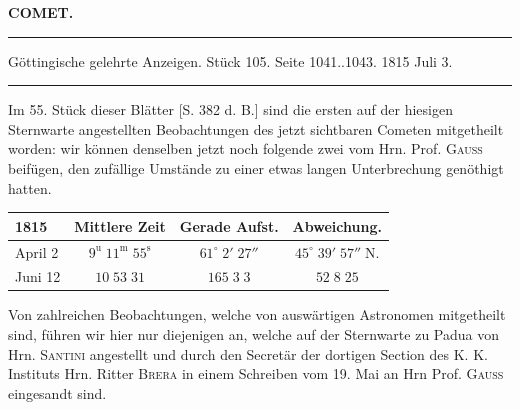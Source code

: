 \clearpage{}\hypertarget{native-390-lower}{}\label{native-390-lower}
\begin{center}\textbf{COMET.}\par\vspace{4pt}\hrule\vspace{4pt}\fontsize{10}{12}\selectfont Göttingische gelehrte Anzeigen. Stück 105. Seite 1041..1043. 1815 Juli 3.\par\vspace{4pt}\hrule\vspace{4pt}\end{center}

\par\indent Im 55. Stück dieser Blätter [S. 382 d. B.] sind die ersten auf der hiesigen Sternwarte
angestellten Beobachtungen des jetzt sichtbaren Cometen mitgetheilt worden: wir können denselben
jetzt noch folgende zwei vom Hrn. Prof. \textsc{Gauss} beifügen, den zufällige Umstände zu einer etwas
langen Unterbrechung genöthigt hatten.

\begin{center}\fontsize{10}{12}\selectfont\setlength{\tabcolsep}{4pt}\renewcommand{\arraystretch}{1.15}\begin{tabular}{l|c|c|c}
1815 & Mittlere Zeit & Gerade Aufst. & Abweichung.\\\hline
April 2 & $9^{\mathrm u}\;11^{\mathrm m}\;55^{\mathrm s}$ & $61^\circ\;2'\;27''$ & $45^\circ\;39'\;57''\;\mathrm{N.}$\\
Juni 12 & $10\;53\;31$ & $165\;3\;3$ & $52\;8\;25$\\
\end{tabular}\end{center}

\par\indent Von zahlreichen Beobachtungen, welche von auswärtigen Astronomen mitgetheilt sind, führen wir
hier nur diejenigen an, welche auf der Sternwarte zu Padua von Hrn. \textsc{Santini} angestellt und durch
den Secretär der dortigen Section des K. K. Instituts Hrn. Ritter \textsc{Brera} in einem Schreiben vom 19.
Mai an Hrn Prof. \textsc{Gauss} eingesandt sind.

